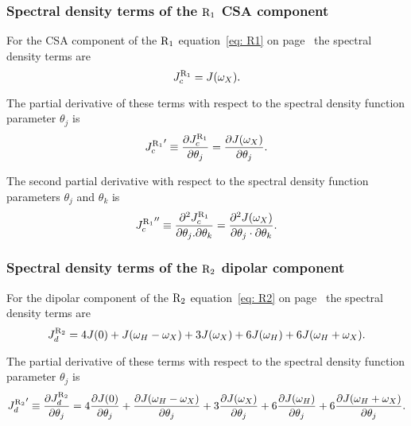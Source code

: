 \subsubsection{Spectral density terms of the $\mathrm{R}_1$ CSA component}

For the CSA component of the $\mathrm{R}_1$ equation~\eqref{eq: R1} on page~\pageref{eq: R1} the spectral density terms are
\begin{equation}
    J_c^{\mathrm{R}_1} = J(\omega_X).  \label{eq: J terms: JR1c}
\end{equation}

\noindent The partial derivative of these terms with respect to the spectral density function parameter $\theta_j$ is
\begin{equation}
    {J_c^{\mathrm{R}_1}}' \equiv \frac{\partial J_c^{\mathrm{R}_1}}{\partial \theta_j}
        = \frac{\partial J(\omega_X)}{\partial \theta_j}.  \label{eq: J terms: JR1c'}
\end{equation}

\noindent The second partial derivative with respect to the spectral density function parameters $\theta_j$ and $\theta_k$ is
\begin{equation}
    {J_c^{\mathrm{R}_1}}'' \equiv \frac{\partial^2 J_c^{\mathrm{R}_1}}{\partial \theta_j . \partial \theta_k}
        = \frac{\partial^2 J(\omega_X)}{\partial \theta_j \cdot \partial \theta_k}.  \label{eq: J terms: JR1c"}
\end{equation}


\subsubsection{Spectral density terms of the $\mathrm{R}_2$ dipolar component}

For the dipolar component of the $\mathrm{R}_2$ equation~\eqref{eq: R2} on page~\pageref{eq: R2} the spectral density terms are
\begin{equation}
    J_d^{\mathrm{R}_2} = 4J(0) + J(\omega_H - \omega_X) + 3J(\omega_X) + 6J(\omega_H) + 6J(\omega_H + \omega_X).  \label{eq: J terms: JR2d}
\end{equation}

\noindent The partial derivative of these terms with respect to the spectral density function parameter $\theta_j$ is
\begin{equation}
    {J_d^{\mathrm{R}_2}}' \equiv \frac{\partial J_d^{\mathrm{R}_2}}{\partial \theta_j}
        = 4 \frac{\partial J(0)}{\partial \theta_j}
        + \frac{\partial J(\omega_H - \omega_X)}{\partial \theta_j}
        + 3 \frac{\partial J(\omega_X)}{\partial \theta_j}
        + 6 \frac{\partial J(\omega_H)}{\partial \theta_j}
        + 6 \frac{\partial J(\omega_H + \omega_X)}{\partial \theta_j}.  \label{eq: J terms: JR2d'}
\end{equation}

